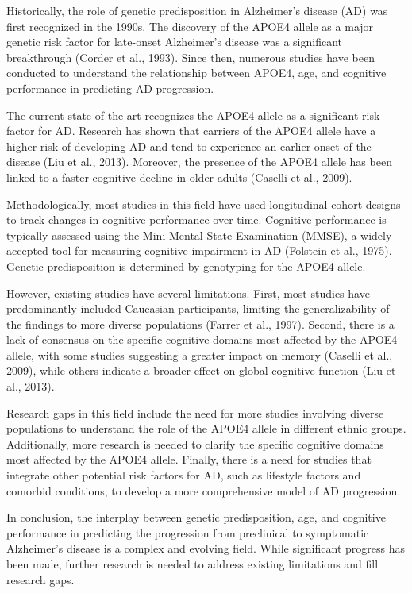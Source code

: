 \documentclass[conference]{IEEEtran}
\begin{document}
Historically, the role of genetic predisposition in Alzheimer's disease (AD) was first recognized in the 1990s. The discovery of the APOE4 allele as a major genetic risk factor for late-onset Alzheimer's disease was a significant breakthrough (Corder et al., 1993). Since then, numerous studies have been conducted to understand the relationship between APOE4, age, and cognitive performance in predicting AD progression.

The current state of the art recognizes the APOE4 allele as a significant risk factor for AD. Research has shown that carriers of the APOE4 allele have a higher risk of developing AD and tend to experience an earlier onset of the disease (Liu et al., 2013). Moreover, the presence of the APOE4 allele has been linked to a faster cognitive decline in older adults (Caselli et al., 2009). 

Methodologically, most studies in this field have used longitudinal cohort designs to track changes in cognitive performance over time. Cognitive performance is typically assessed using the Mini-Mental State Examination (MMSE), a widely accepted tool for measuring cognitive impairment in AD (Folstein et al., 1975). Genetic predisposition is determined by genotyping for the APOE4 allele. 

However, existing studies have several limitations. First, most studies have predominantly included Caucasian participants, limiting the generalizability of the findings to more diverse populations (Farrer et al., 1997). Second, there is a lack of consensus on the specific cognitive domains most affected by the APOE4 allele, with some studies suggesting a greater impact on memory (Caselli et al., 2009), while others indicate a broader effect on global cognitive function (Liu et al., 2013). 

Research gaps in this field include the need for more studies involving diverse populations to understand the role of the APOE4 allele in different ethnic groups. Additionally, more research is needed to clarify the specific cognitive domains most affected by the APOE4 allele. Finally, there is a need for studies that integrate other potential risk factors for AD, such as lifestyle factors and comorbid conditions, to develop a more comprehensive model of AD progression.

In conclusion, the interplay between genetic predisposition, age, and cognitive performance in predicting the progression from preclinical to symptomatic Alzheimer's disease is a complex and evolving field. While significant progress has been made, further research is needed to address existing limitations and fill research gaps.
\end{document}
